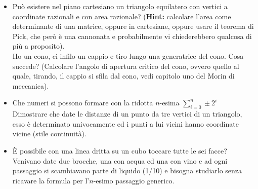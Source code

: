 \documentclass[a4paper,11pt]{article}
\newcommand{\Hint}{{\bf Hint: }}
\begin{document}
\begin{itemize}
\item Pu\`o esistere nel piano cartesiano un triangolo equilatero con vertici a coordinate razionali e con area razionale? (\Hint calcolare l'area come determinante di una matrice, oppure in cartesiane, oppure usare il teorema di Pick, che per\`o \`e una cannonata e probabilmente vi chiederebbero qualcosa di pi\`u a proposito). \\ Ho un cono, ci infilo un cappio e tiro lungo una generatrice del cono. Cosa succede? (Calcolare l'angolo di apertura critico del cono, ovvero quello al quale, tirando, il cappio si sfila dal cono, vedi capitolo uno del Morin di meccanica).
\item Che numeri si possono formare con la ridotta $n$-esima $\sum_{i=0}^n \pm 2^i$ \\ Dimostrare che date le distanze di un punto da tre vertici di un triangolo, esso \`e determinato univocamente ed i punti a lui vicini hanno coordinate vicine (stile continuit\`a).
\item \`E possibile con una linea dritta su un cubo toccare tutte le sei facce? Venivano date due brocche, una con acqua ed una con vino e ad ogni passaggio si scambiavano parte di liquido (1/10) e bisogna studiarlo senza ricavare la formula per l'$n$-esimo passaggio generico.
\end{itemize}
\end{document}
